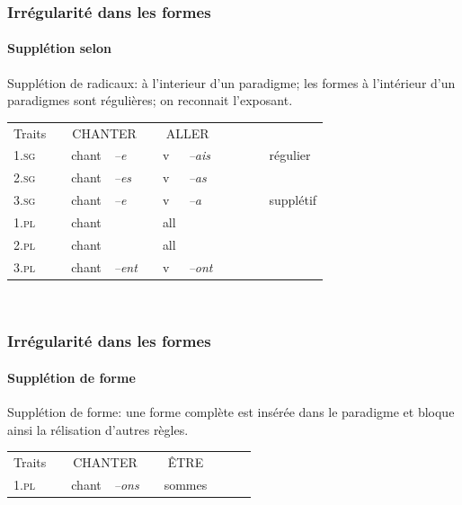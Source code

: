 \begin{frame}
\frametitle{Irrégularité dans les formes}
\framesubtitle{Supplétion selon \cite{boye06}}
Supplétion de radicaux:  à l'interieur d'un paradigme; les formes à
l'intérieur d'un paradigmes sont régulières; on reconnait l'exposant.

\scriptsize
\begin{table}
\begin{tabular}{|l|p{1mm}|ll|p{1mm}|ll|p{1mm}cl}
\cline{1-1}\cline{3-4}\cline{6-7}
Traits&&\multicolumn{2}{|c|}{\scriptsize{CHANTER}}&&\multicolumn{2}{|c|}{\scriptsize{ALLER}}&&\\
\cline{1-1}\cline{3-4}\cline{6-7}
\textsc{1.sg}&& chant& {\em --e}&&v& {\em
  --ais}&&\cellcolor{ciel}~~~&régulier\\
\cline{1-1}\cline{3-4}\cline{6-7}
\textsc{2.sg} &&chant&{\em --es}&&v& {\em --as}&&&\\
\cline{1-1}\cline{3-4}\cline{6-7}
\textsc{3.sg}&& chant&{\em --e}&&v& {\em
  --a}&&\cellcolor{mandarine}&supplétif\\
\cline{1-1}\cline{3-4}\cline{6-7}
\textsc{1.pl}&&chant&\cellcolor{ciel}{\em --ons}&&\cellcolor{mandarine} all& \cellcolor{ciel}{\em --ons}&&\\
\cline{1-1}\cline{3-4}\cline{6-7}
\textsc{2.pl}&&chant& \cellcolor{ciel}{\em --ez}&&\cellcolor{mandarine} all& \cellcolor{ciel}{\em --ez}&&\\
\cline{1-1}\cline{3-4}\cline{6-7}
\textsc{3.pl}&&chant& {\em --ent}&&v& {\em --ont}&&\\
\cline{1-1}\cline{3-4}\cline{6-7}
\end{tabular}\\[1mm]
\end{table}
\end{frame}


\begin{frame}
\frametitle{Irrégularité dans les formes}
\framesubtitle{Supplétion de forme \cite{boye06}}
Supplétion de forme: une forme complète est insérée dans le paradigme
et bloque ainsi la rélisation d'autres règles.

\begin{table}
\begin{tabular}{|l| p{1mm}|ll|p{1mm}|ll|p{1mm}cl}
\cline{1-1}\cline{3-4}\cline{6-7}
Traits&&\multicolumn{2}{|c|}{\scriptsize{CHANTER}}&&\multicolumn{2}{|c|}{\scriptsize{ÊTRE}}&&\\
\cline{1-1}\cline{3-4}\cline{6-7}
\textsc{1.pl}&&chant& {\em --ons}&&\multicolumn{2}{|l|}{\cellcolor{mandarine} sommes}& {\em }&&\\
\cline{1-1}\cline{3-4}\cline{6-7}
\end{tabular}\\[1mm]
\end{table}
\end{frame}


